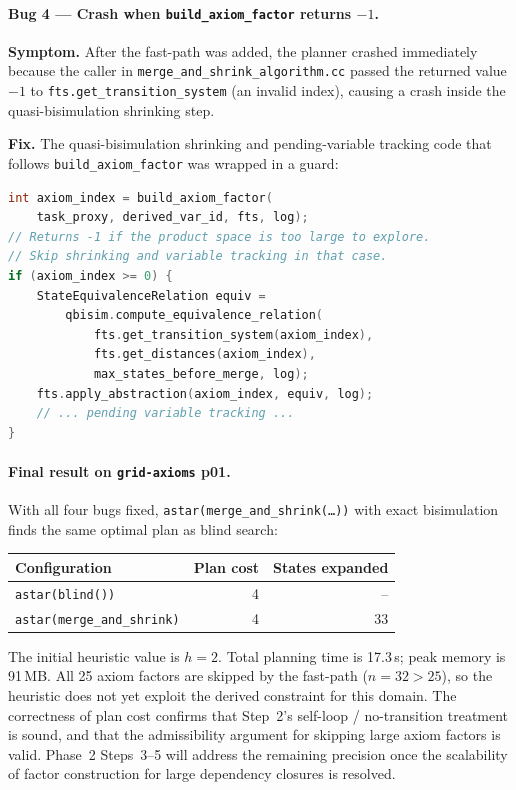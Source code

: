 \documentclass[11pt,a4paper]{article}
\begin{document}
\begin{itemize}
    \paragraph{Bug 4 --- Crash when \texttt{build\_axiom\_factor} returns $-1$.}
    \textbf{Symptom.}  After the fast-path was added, the planner crashed
    immediately because the caller in \texttt{merge\_and\_shrink\_algorithm.cc}
    passed the returned value $-1$ to \texttt{fts.get\_transition\_system} (an
    invalid index), causing a crash inside the quasi-bisimulation shrinking step.

    \textbf{Fix.}  The quasi-bisimulation shrinking and pending-variable tracking
    code that follows \texttt{build\_axiom\_factor} was wrapped in a guard:
\begin{lstlisting}[language=C++]
int axiom_index = build_axiom_factor(
    task_proxy, derived_var_id, fts, log);
// Returns -1 if the product space is too large to explore.
// Skip shrinking and variable tracking in that case.
if (axiom_index >= 0) {
    StateEquivalenceRelation equiv =
        qbisim.compute_equivalence_relation(
            fts.get_transition_system(axiom_index),
            fts.get_distances(axiom_index),
            max_states_before_merge, log);
    fts.apply_abstraction(axiom_index, equiv, log);
    // ... pending variable tracking ...
}
\end{lstlisting}

    \paragraph{Final result on \texttt{grid-axioms} p01.}

    With all four bugs fixed, \texttt{astar(merge\_and\_shrink(\ldots))}
    with exact bisimulation finds the same optimal plan as blind search:

    \begin{center}
    \begin{tabular}{lrr}
    \toprule
    \textbf{Configuration} & \textbf{Plan cost} & \textbf{States expanded} \\
    \midrule
    \texttt{astar(blind())}            & 4 & -- \\
    \texttt{astar(merge\_and\_shrink)} & 4 & 33 \\
    \bottomrule
    \end{tabular}
    \end{center}

    The initial heuristic value is $h = 2$.  Total planning time is 17.3\,s;
    peak memory is 91\,MB.  All 25 axiom factors are skipped by the fast-path
    ($n = 32 > 25$), so the heuristic does not yet exploit the derived
    constraint for this domain.  The correctness of plan cost confirms that
    Step~2's self-loop / no-transition treatment is sound, and that the
    admissibility argument for skipping large axiom factors is valid.  Phase~2
    Steps~3--5 will address the remaining precision once the scalability of
    factor construction for large dependency closures is resolved.


\end{itemize}
\end{document}
